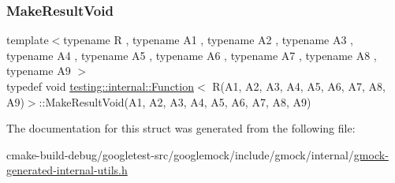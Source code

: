\subsubsection{\texorpdfstring{MakeResultVoid}{MakeResultVoid}}
{\footnotesize\ttfamily template$<$typename R , typename A1 , typename A2 , typename A3 , typename A4 , typename A5 , typename A6 , typename A7 , typename A8 , typename A9 $>$ \\
typedef void \mbox{\hyperlink{structtesting_1_1internal_1_1Function}{testing\+::internal\+::\+Function}}$<$ R(A1, A2, A3, A4, A5, A6, A7, A8, A9)$>$\+::Make\+Result\+Void(A1, A2, A3, A4, A5, A6, A7, A8, A9)}



The documentation for this struct was generated from the following file\+:\begin{DoxyCompactItemize}
\item 
cmake-\/build-\/debug/googletest-\/src/googlemock/include/gmock/internal/\mbox{\hyperlink{gmock-generated-internal-utils_8h}{gmock-\/generated-\/internal-\/utils.\+h}}\end{DoxyCompactItemize}
